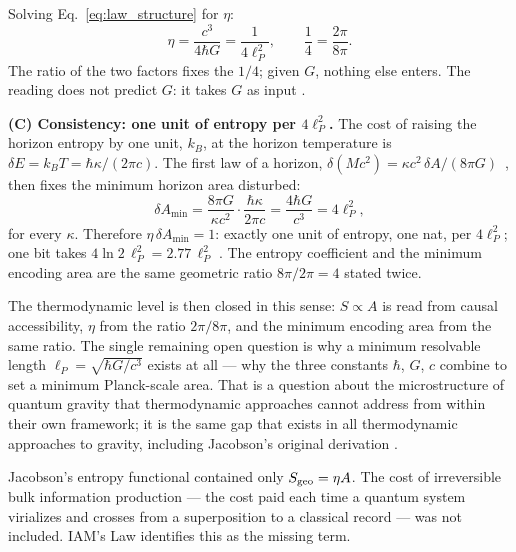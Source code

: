 Solving Eq.~\eqref{eq:law_structure} for $\eta$:
\begin{equation}
\eta=\frac{c^3}{4\hbar G}=\frac{1}{4\ell_P^2},\qquad \frac14=\frac{2\pi}{8\pi}. \label{eq:law_eta}
\end{equation}
The ratio of the two factors fixes the $1/4$; given $G$, nothing else enters. The reading does not predict $G$: it takes $G$ as input \derived.

\textbf{(C) Consistency: one unit of entropy per $4\ell_P^2$.} The cost of raising the horizon entropy by one unit, $k_B$, at the horizon temperature is
$\delta E=k_BT=\hbar\kappa/(2\pi c)$. The first law of a horizon, $\delta(Mc^2)=\kappa c^2\,\delta A/(8\pi G)$~\cite{BardeenCarterHawking1973}, then fixes the
minimum horizon area disturbed:
\begin{equation}
\delta A_{\min}=\frac{8\pi G}{\kappa c^2}\cdot\frac{\hbar\kappa}{2\pi c}=\frac{4\hbar G}{c^3}=4\ell_P^2, \label{eq:law_dAmin}
\end{equation}
for every $\kappa$. Therefore $\eta\,\delta A_{\min}=1$: exactly one unit of entropy, one nat, per $4\ell_P^2$; one bit takes $4\ln2\,\ell_P^2=2.77\,\ell_P^2$
\derived. The entropy coefficient and the minimum encoding area are the same geometric ratio $8\pi/2\pi=4$ stated twice.

The thermodynamic level is then closed in this sense: $S\propto A$ is read from causal accessibility, $\eta$ from the ratio $2\pi/8\pi$, and the minimum
encoding area from the same ratio. The single remaining open question is why a minimum resolvable length $\ell_P=\sqrt{\hbar G/c^3}$ exists at all --- why the
three constants $\hbar$, $G$, $c$ combine to set a minimum Planck-scale area. That is a question about the microstructure of quantum gravity that
thermodynamic approaches cannot address from within their own framework; it is the same gap that exists in all thermodynamic approaches to gravity,
including Jacobson's original derivation \openprob.

Jacobson's entropy functional contained only $S_{\rm geo}=\eta A$. The cost of irreversible bulk information production --- the cost paid each time a
quantum system virializes and crosses from a superposition to a classical record --- was not included. IAM's Law identifies this as the missing term.

